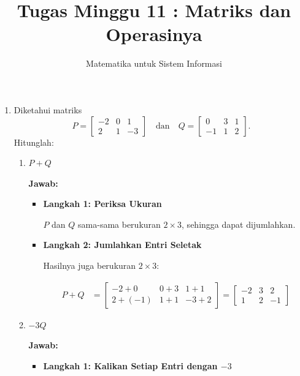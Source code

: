 \documentclass[10pt,a4paper]{article}
\title{Tugas Minggu 11 : Matriks dan Operasinya}
\author{Matematika untuk Sistem Informasi}
\date{}
\newcounter{eqblock}
\newcommand{\reseteq}{%
  \stepcounter{eqblock}%
  \setcounter{equation}{0}%
  \renewcommand{\theHequation}{\arabic{eqblock}.\arabic{equation}}%
}
\begin{document}
\maketitle

\begin{enumerate}

\item Diketahui matriks
\[
P = \begin{bmatrix} -2 & 0 & 1 \\ 2 & 1 & -3 \end{bmatrix} \quad \text{dan} \quad
Q = \begin{bmatrix} 0 & 3 & 1 \\ -1 & 1 & 2 \end{bmatrix}.
\]
Hitunglah:
\begin{enumerate}

\item $P + Q$

\textbf{Jawab:}
\begin{itemize}
\item \textbf{Langkah 1: Periksa Ukuran}

$P$ dan $Q$ sama-sama berukuran $2 \times 3$, sehingga dapat dijumlahkan.

\item \textbf{Langkah 2: Jumlahkan Entri Seletak}

Hasilnya juga berukuran $2 \times 3$:
\reseteq
\begin{align}
P + Q &= \begin{bmatrix} -2 + 0 & 0 + 3 & 1 + 1 \\ 2 + (-1) & 1 + 1 & -3 + 2 \end{bmatrix}
= \begin{bmatrix} -2 & 3 & 2 \\ 1 & 2 & -1 \end{bmatrix}
\end{align}
\end{itemize}

\item $-3Q$

\textbf{Jawab:}
\begin{itemize}
\item \textbf{Langkah 1: Kalikan Setiap Entri dengan $-3$}


\end{itemize}
\end{enumerate}
\end{enumerate}
\end{document}
